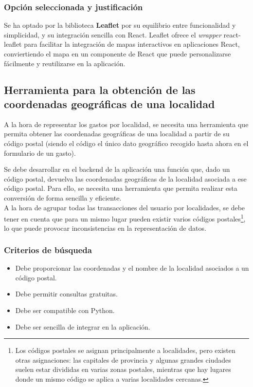 \subsubsection{Opción seleccionada y justificación}
Se ha optado por la biblioteca \textbf{Leaflet} por su equilibrio entre funcionalidad y simplicidad, y su integración sencilla con React. Leaflet ofrece el \textit{wrapper} react-leaflet para facilitar la integración de mapas interactivos en aplicaciones React, conviertiendo el mapa en un componente de React que puede personalizarse fácilmente y reutilizarse en la aplicación\cite{khan2023reactjs}.


\subsection{Herramienta para la obtención de las coordenadas geográficas de una localidad}
A la hora de representar los gastos por localidad, se necesita una herramienta que permita obtener las coordenadas geográficas de una localidad a partir de su código postal (siendo el código el único dato geográfico recogido hasta ahora en el formulario de un gasto). 

Se debe desarrollar en el backend de la aplicación una función que, dado un código postal, devuelva las coordenadas geográficas de la localidad asociada a ese código postal. Para ello, se necesita una herramienta que permita realizar esta conversión de forma sencilla y eficiente.\\

A la hora de agrupar todas las transacciones del usuario por localidades, se debe tener en cuenta que para un mismo lugar pueden existir varios códigos postales\footnote{Los códigos postales se asignan principalmente a localidades, pero existen otras asignaciones: las capitales de provincia y algunas grandes ciudades suelen estar divididas en varias zonas postales, mientras que hay lugares donde un mismo código se aplica a varias localidades cercanas\cite{cp-wikipedia}.}, lo que puede provocar inconsistencias en la representación de datos.

\subsubsection{Criterios de búsqueda}
\begin{itemize}
    \item Debe proporcionar las coordenadas y el nombre de la localidad asociados a un código postal.
    \item Debe permitir consultas gratuitas.
    \item Debe ser compatible con Python.
    \item Debe ser sencilla de integrar en la aplicación.
\end{itemize}
